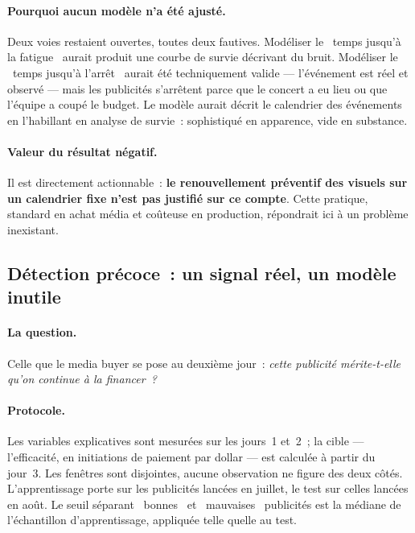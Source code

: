 \documentclass[11pt,a4paper]{article}
\begin{document}
\paragraph{Pourquoi aucun modèle n'a été ajusté.} Deux voies restaient
ouvertes, toutes deux fautives. Modéliser le \guillemotleft~temps jusqu'à la
fatigue~\guillemotright{} aurait produit une courbe de survie décrivant du
bruit. Modéliser le \guillemotleft~temps jusqu'à l'arrêt~\guillemotright{}
aurait été techniquement valide --- l'événement est réel et observé --- mais
les publicités s'arrêtent parce que le concert a eu lieu ou que l'équipe a
coupé le budget. Le modèle aurait décrit le calendrier des événements en
l'habillant en analyse de survie~: sophistiqué en apparence, vide en substance.

\paragraph{Valeur du résultat négatif.} Il est directement actionnable~:
\textbf{le renouvellement préventif des visuels sur un calendrier fixe n'est
pas justifié sur ce compte}. Cette pratique, standard en achat média et
coûteuse en production, répondrait ici à un problème inexistant.

\subsection{Détection précoce~: un signal réel, un modèle inutile}

\paragraph{La question.} Celle que le media buyer se pose au deuxième jour~:
\emph{cette publicité mérite-t-elle qu'on continue à la financer~?}

\paragraph{Protocole.} Les variables explicatives sont mesurées sur les jours~1
et~2~; la cible --- l'efficacité, en initiations de paiement par dollar --- est
calculée à partir du jour~3. Les fenêtres sont disjointes, aucune observation
ne figure des deux côtés. L'apprentissage porte sur les publicités lancées en
juillet, le test sur celles lancées en août. Le seuil séparant
\guillemotleft~bonnes~\guillemotright{} et \guillemotleft~mauvaises~
\guillemotright{} publicités est la médiane de l'échantillon d'apprentissage,
appliquée telle quelle au test.
\end{document}
